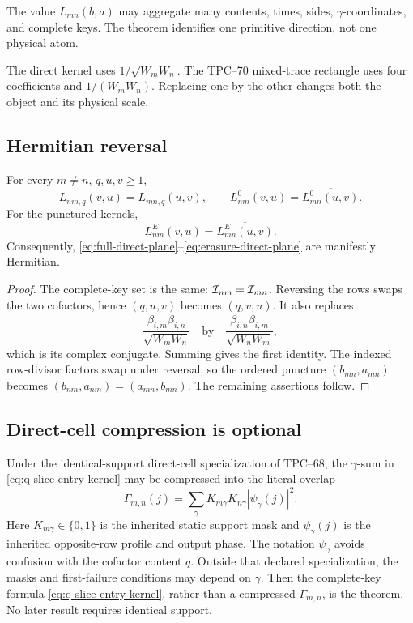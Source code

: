 \begin{remark}
The value \(L_{mn}(b,a)\) may aggregate many contents, times, sides,
\(\gamma\)-coordinates, and complete keys.  The theorem identifies one
primitive direction, not one physical atom.
\end{remark}

\begin{remark}
The direct kernel uses \(1/\sqrt{W_mW_n}\).  The TPC--70 mixed-trace
rectangle uses four coefficients and \(1/(W_mW_n)\).  Replacing one by
the other changes both the object and its physical scale.
\end{remark}

\subsection{Hermitian reversal}

\begin{theorem}
\label{thm:reversed-pair-conjugacy}
For every \(m\ne n\), \(q,u,v\ge1\),
\begin{equation}
 \boxed{
 L_{nm,q}(v,u)=\overline{L_{mn,q}(u,v)},\qquad
 L_{nm}^{0}(v,u)=\overline{L_{mn}^{0}(u,v)}.}
 \label{eq:kernel-Hermitian-reversal}
\end{equation}
For the punctured kernels,
\[
 L_{nm}^{E}(v,u)=\overline{L_{mn}^{E}(u,v)}.
\]
Consequently, \eqref{eq:full-direct-plane}--\eqref{eq:erasure-direct-plane}
are manifestly Hermitian.
\end{theorem}

\begin{proof}
The complete-key set is the same:
\(\mathcal I_{nm}=\mathcal I_{mn}\).  Reversing the rows swaps the two cofactors, hence
\((q,u,v)\) becomes \((q,v,u)\).  It also replaces
\[
 \frac{\overline{\beta_{i,m}}\beta_{i,n}}{\sqrt{W_mW_n}}
 \quad\text{by}\quad
 \frac{\overline{\beta_{i,n}}\beta_{i,m}}{\sqrt{W_nW_m}},
\]
which is its complex conjugate.  Summing gives the first identity.
The indexed row-divisor factors swap under reversal, so the ordered
puncture \((b_{mn},a_{mn})\) becomes
\((b_{nm},a_{nm})=(a_{mn},b_{mn})\).  The remaining assertions follow.
\end{proof}

\subsection{Direct-cell compression is optional}

Under the identical-support direct-cell specialization of TPC--68, the
\(\gamma\)-sum in \eqref{eq:q-slice-entry-kernel} may be compressed into
the literal overlap
\[
 \Gamma_{m,n}(j)
 =
 \sum_\gamma K_{m\gamma}K_{n\gamma}|\psi_\gamma(j)|^2.
\]
Here \(K_{m\gamma}\in\{0,1\}\) is the inherited static support mask and
\(\psi_\gamma(j)\) is the inherited opposite-row profile and output
phase.  The notation \(\psi_\gamma\) avoids confusion with the cofactor
content \(q\).
Outside that declared specialization, the masks and first-failure
conditions may depend on \(\gamma\).  Then the complete-key formula
\eqref{eq:q-slice-entry-kernel}, rather than a compressed
\(\Gamma_{m,n}\), is the theorem.  No later result requires identical
support.
